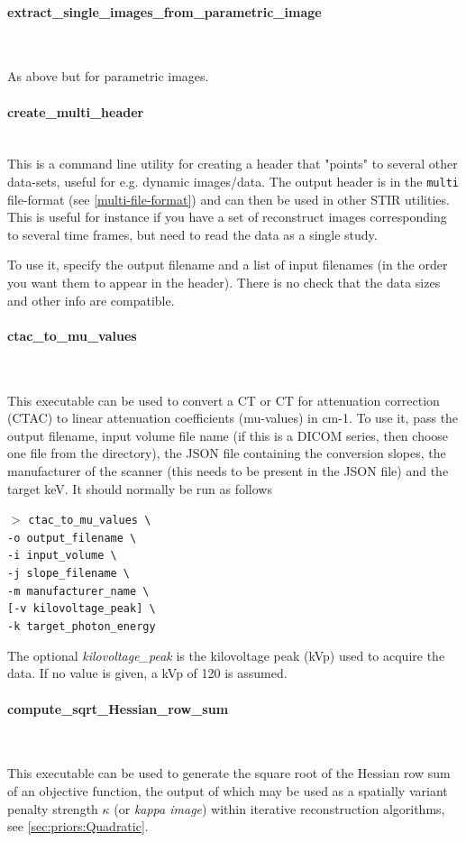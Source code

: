\documentclass{article}
\newcommand{\subsubsubsection}[1]{\paragraph{#1}\mbox{} \\}
\newcommand{\cmdline}[1]{\par \noindent $>$ \texttt{#1}\par}
\begin{document}
{ {\subsubsubsection{extract\_single\_images\_from\_parametric\_image}
}

As above but for parametric images.

{ \subsubsubsection{create\_multi\_header}
  This is a command line utility for creating a header that "points" to several other
  data-sets, useful for e.g. dynamic images/data. The output header is in the \texttt{multi}
  file-format (see \ref{multi-file-format}) and can then be used in
  other STIR utilities. This is useful for instance if you have
  a set of reconstruct images corresponding to several time frames, but need to read the data
  as a single study.

  To use it, specify the output filename and a list of input filenames (in the order you want
  them to appear in the header).
  There is no check that the data sizes and other info are compatible.

{ \subsubsubsection{ctac\_to\_mu\_values}
}

This executable can be used to convert a CT or CT for attenuation correction (CTAC) to linear attenuation coefficients
(mu-values) in cm-1. To use it, pass the output filename, input volume file name (if this is a DICOM series, then
choose one file from the directory), the JSON file containing the conversion slopes, the manufacturer of the scanner
(this needs to be present in the JSON file) and the target keV. It should normally be run as follows

\cmdline{ctac\_to\_mu\_values {\textbackslash}\\
-o output\_filename {\textbackslash}\\
-i input\_volume {\textbackslash}\\
-j slope\_filename {\textbackslash}\\
-m manufacturer\_name {\textbackslash}\\
{[}-v kilovoltage\_peak{]} {\textbackslash}\\
-k target\_photon\_energy}

The optional \textit{kilovoltage\_peak} is the kilovoltage peak (kVp) used to acquire the data. If no value is given,
a kVp of 120 is assumed. 

{ \subsubsubsection{compute\_sqrt\_Hessian\_row\_sum} \label{sec:Utilities:HessianRowSum}
}
This executable can be used to generate the square root of the Hessian row sum of an objective function, the output of
which may be used as a spatially variant penalty strength $\kappa$ (or \textit{kappa image}) within iterative
reconstruction algorithms, see \ref{sec:priors:Quadratic}.

}}
\end{document}
